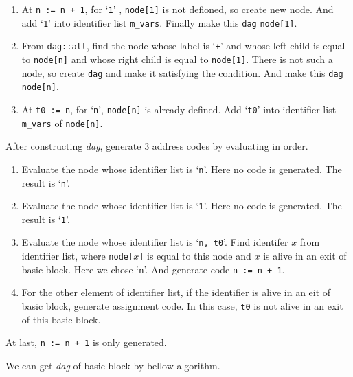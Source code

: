 \begin{Example}
\begin{enumerate}
\item At {\tt{n := n + 1}}, for `{\tt{1}}' ,
 {\tt{node[1]}} is not defioned, so create new node. And 
add `{\tt{1}}' into identifier list {\tt{m\_vars}}.
Finally make this {\tt{dag}} {\tt{node[1]}}.

\item From {\tt{dag::all}}, find the node whose label is `{\tt{+}}'
and whose left child is equal to {\tt{node[n]}}
and whose right child is equal to {\tt{node[1]}}.
There is not such a node, so create {\tt{dag}}  and
make it satisfying the condition.
And make this {\tt{dag}} {\tt{node[n]}}.

\item At {\tt{t0 := n}}, for `{\tt{n}}',
{\tt{node[n]}} is already defined.
Add `{\tt{t0}}' into identifier list {\tt{m\_vars}} of {\tt{node[n]}}.
\end{enumerate}
After constructing {\em dag}, generate 3 address codes by evaluating
in order.

\begin{enumerate}
\item Evaluate the node whose identifier list is `{\tt{n}}'.
      Here no code is generated. The result is `{\tt{n}}'.

\item Evaluate the node whose identifier list is `{\tt{1}}'.
      Here no code is generated. The result is `{\tt{1}}'.

\item Evaluate the node whose identifier list is `{\tt{n, t0}}'.
      Find identifer $x$ from identifier list, where {\tt{node[$x$]}} is equal
      to this node and $x$ is alive in an exit of basic block.
      Here we chose `{\tt{n}}'.
      And generate code {\tt{n := n + 1}}.
 
\item For the other element of identifier list, if the identifier
      is alive in an eit of basic block, generate assignment code.
      In this case, {\tt{t0}} is not alive in an exit of this
      basic block.

\end{enumerate}
At last, {\tt{n := n + 1}} is only generated.
\end{Example}

We can get {\em dag} of basic block by bellow algorithm.


